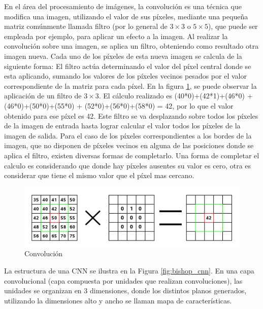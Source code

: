 \documentclass[a4paper,11pt,spanish]{book}
\begin{document}
      En el área del procesamiento de imágenes, la convolución es una técnica que modifica una imagen, utilizando el valor de sus píxeles,
      mediante una pequeña matriz comúnmente llamada filtro (por lo general de $3\times3$ o $5\times5$), que puede ser empleada por ejemplo, para aplicar un efecto 
      a la imagen.
      Al realizar la convolución sobre una imagen, se aplica un filtro, obteniendo como resultado otra imagen nueva. Cada uno de los píxeles de esta nueva imagen se 
      calcula de la siguiente forma:
      El filtro actúa determinando el valor del píxel central donde se esta aplicando, sumando los valores de los píxeles vecinos pesados por el valor correspondiente de la matriz para
      cada píxel. En la figura \ref{fig:convolution}, se puede observar la aplicación de un filtro de $3\times3$. El cálculo realizado es (40*0)+(42*1)+(46*0) + (46*0)+(50*0)+(55*0) + (52*0)+(56*0)+(58*0) = 42,
      por lo que el valor obtenido para ese píxel es 42.
      Este filtro se va desplazando sobre todos los píxeles de la imagen de entrada hasta lograr calcular el valor todos los píxeles de la imagen de salida. 
      Para el caso de los píxeles correspondientes a los bordes de la imagen, que no disponen de píxeles vecinos en alguna de las posiciones donde se aplica el filtro, 
      existen diversas formas de completarlo. 
      Una forma de completar el calculo es considerando que donde hay píxeles ausentes su valor es cero, otra es considerar que tiene el mismo valor que el píxel mas cercano.
      
      \begin{figure}[h]
	\begin{center}
	\includegraphics[width=0.8\linewidth]{./img/convolution.png}
	\end{center}
	\caption{Convolución}
	\label{fig:convolution}
      \end{figure}

      La estructura de una CNN se ilustra en la Figura \ref{fig:bishop_cnn}. En una capa convolucional (capa compuesta por unidades que realizan convoluciones), 
      las unidades se organizan en 3 dimensiones, donde los distintos planos generados, utilizando la dimensiones alto y ancho se llaman mapa de características.
      
\end{document}
